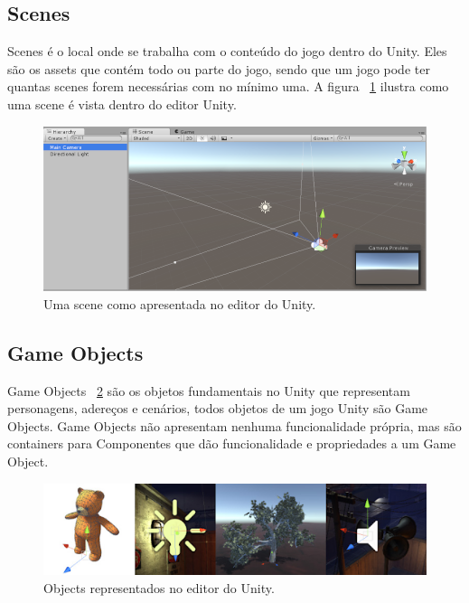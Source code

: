 \documentclass[
	12pt,				%
	openright,			%
	twoside,			%
	a4paper,			%
	english,			%
	french,				%
	spanish,			%
	brazil				%
	]{abntex2}
\begin{document}
\subsection{Scenes}

Scenes é o local onde se trabalha com o conteúdo do jogo dentro do Unity. Eles são os assets que contém todo ou parte do jogo, sendo que um jogo pode ter quantas scenes forem necessárias com no mínimo uma. A figura ~\ref{fig:scene1} ilustra como uma scene é vista dentro do editor Unity.

\begin{figure}[h!]
  \includegraphics[width=\linewidth]{scene.jpg}
  \caption{Uma scene como apresentada no editor do Unity.}
  \label{fig:scene1}
\end{figure}
\subsection{Game Objects}

Game Objects ~\ref{fig:objects} são os objetos fundamentais no Unity que representam personagens, adereços e cenários, todos objetos de um jogo Unity são Game Objects. Game Objects não apresentam nenhuma funcionalidade própria, mas são containers para Componentes que dão funcionalidade e propriedades a um Game Object.

\begin{figure}[h!]
  \includegraphics[width=\linewidth]{object.jpg}
  \caption{Objects representados no editor do Unity.}
  \label{fig:objects}
\end{figure}
\end{document}
